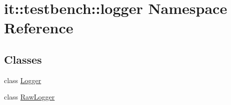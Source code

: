 \hypertarget{namespaceit_1_1testbench_1_1logger}{\section{it\-:\-:testbench\-:\-:logger Namespace Reference}
\label{d1/d33/namespaceit_1_1testbench_1_1logger}
}
\subsection*{Classes}
\begin{DoxyCompactItemize}
\item 
class \hyperlink{classit_1_1testbench_1_1logger_1_1Logger}{Logger}
\item 
class \hyperlink{classit_1_1testbench_1_1logger_1_1RawLogger}{Raw\-Logger}
\end{DoxyCompactItemize}
